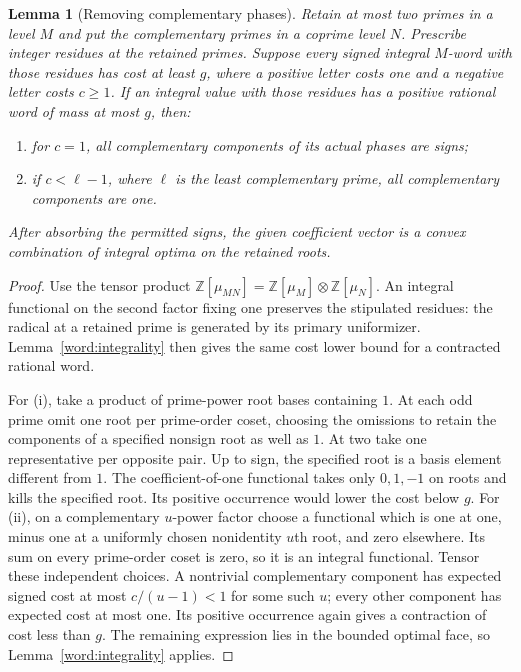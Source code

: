 \documentclass[11pt,a4paper]{article}
\numberwithin{equation}{section}
\newtheorem{lemma}[theorem]{Lemma}
\begin{document}
\begin{lemma}[Removing complementary phases]\label{word:contraction}
Retain at most two primes in a level $M$ and put the complementary
primes in a coprime level $N$. Prescribe integer residues at the
retained primes. Suppose every signed integral $M$-word with those
residues has cost at least $g$, where a positive letter costs one
and a negative letter costs $c\ge1$. If an integral value with
those residues has a positive rational word of mass at most $g$,
then:
\begin{enumerate}[label=\textup{(\roman*)},leftmargin=*]
\item for $c=1$, all complementary components of its actual phases
      are signs;
\item if $c<\ell-1$, where $\ell$ is the least complementary prime,
      all complementary components are one.
\end{enumerate}
After absorbing the permitted signs, the given coefficient vector
is a convex combination of integral optima on the retained roots.
\end{lemma}
\begin{proof}
Use the tensor product
$\mathbb Z[\mu_{MN}]=\mathbb Z[\mu_M]\otimes\mathbb Z[\mu_N]$.
An integral functional on the second factor fixing one preserves
the stipulated residues: the radical at a retained prime is
generated by its primary uniformizer. Lemma~\ref{word:integrality}
then gives the same cost lower bound for a contracted rational word.

For (i), take a product of prime-power root bases containing $1$.
At each odd prime omit one root per prime-order coset, choosing the
omissions to retain the components of a specified nonsign root as well
as $1$. At two take one representative per opposite pair. Up to sign,
the specified root is a basis element different from $1$. The
coefficient-of-one functional takes only $0,1,-1$ on roots and kills
the specified root.
Its positive occurrence would lower the cost below $g$.
For (ii), on a complementary $u$-power factor choose a functional
which is one at one, minus one at a uniformly chosen nonidentity
$u$th root, and zero elsewhere. Its sum on every prime-order
coset is zero, so it is an integral functional. Tensor these
independent choices. A nontrivial complementary component has
expected signed cost at most $c/(u-1)<1$ for some such $u$;
every other component has expected cost at most one. Its positive
occurrence again gives a contraction of cost less than $g$.
The remaining expression lies in the bounded optimal face, so
Lemma~\ref{word:integrality} applies.
\end{proof}
\end{document}

